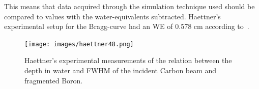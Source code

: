 This means that data acquired through the simulation technique used should be compared to values with the water-equivalents subtracted. Haettner's experimental setup for the Bragg-curve had an WE of 0.578 cm according to~\cite[table 4.1]{ehaettner}.


\begin{figure}[!ht]
\centering
{}
\label{fig:EHaettnerDataForAEDistrib1}
\label{fig:ShouldGiveTableAndFigure}
\end{figure}

\begin{figure}[h] 
\begin{center}
\texttt{[image: images/haettner48.png]}  
\caption{\label{fig:haettner48} Haettner's experimental measurements of the relation between the depth in water and FWHM of the incident Carbon beam and fragmented Boron.}
 \end{center}
 \end{figure}

